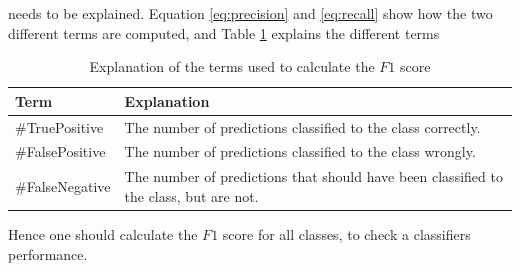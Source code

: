             needs to be explained. Equation \ref{eq:precision} and \ref{eq:recall} show how the two different terms are computed, and Table \ref{tab:prerec} explains the different terms
            
            \begin{table}[h]
                \centering
                \begin{tabular}{| p{4cm} | p{4cm} |}
                    \hline
                    Term & Explanation\\ \hline
                    \#TruePositive & The number of predictions classified to the class correctly.\\ \hline
                    \#FalsePositive & The number of predictions classified to the class wrongly. \\ \hline
                    \#FalseNegative & The number of predictions that should have been classified to the class, but are not. \\ \hline
                \end{tabular}
                \caption{Explanation of the terms used to calculate the $F1$ score}
                \label{tab:prerec}
            \end{table}
            
            Hence one should calculate the $F1$ score for all classes, to check a classifiers performance. 
        
        

